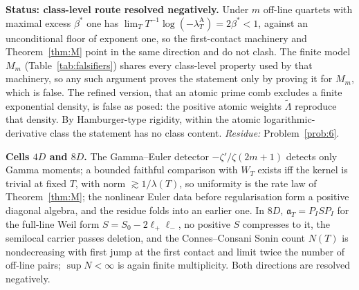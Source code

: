 \documentclass[11pt]{amsart}
\theoremstyle{definition}
\theoremstyle{remark}
\newcommand{\lamA}{\lambda^{\mathrm A}_T}
\begin{document}
\noindent\textbf{Status: class-level route resolved negatively.} Under $m$ off-line quartets with maximal
excess $\beta^*$ one has $\lim_T T^{-1}\log(-\lamA)=2\beta^*<1$, against an unconditional floor of exponent one,
so the first-contact machinery and Theorem~\ref{thm:M} point in the same direction and do not clash. The finite
model $M_m$ (Table~\ref{tab:falsifiers}) shares every class-level property used by that machinery, so any
such argument proves the statement only by proving it for $M_m$, which is false. The refined version, that an
atomic prime comb excludes a finite exponential density, is false as posed: the positive atomic weights
$\tilde\Lambda$ reproduce that density. By Hamburger-type rigidity, within the atomic logarithmic-derivative class
the statement has no class content. \emph{Residue:} Problem~\ref{prob:6}.

\noindent\textbf{Cells $4D$ and $8D$.} The Gamma--Euler detector $-\zeta'/\zeta(2m+1)$ detects only Gamma moments;
a bounded faithful comparison with $W_T$ exists iff the kernel is trivial at fixed $T$, with norm $\gtrsim1/\lambda(T)$,
so uniformity is the rate law of Theorem~\ref{thm:M}; the nonlinear Euler data before regularisation form a positive
diagonal algebra, and the residue folds into an earlier one. In $8D$, $\mathfrak a_T=P_ISP_I$ for the full-line Weil
form $S=S_0-2\ell_+\ell_-$, no positive $S$ compresses to it, the semilocal carrier passes deletion, and the
Connes--Consani Sonin count $N(T)$ is nondecreasing with first jump at the first contact and limit twice the number
of off-line pairs; $\sup N<\infty$ is again finite multiplicity. Both directions are resolved negatively.
\end{document}
